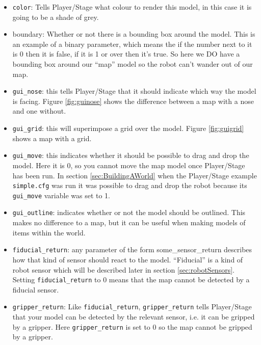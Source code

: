 \documentclass[a4paper]{report}
\newcommand{\plst}{Player/Stage\xspace}
\begin{document}
\begin{itemize}
\item \verb|color|: Tells \plst what colour to render this model, in this case it is going to be a shade of grey. 
\item boundary: Whether or not there is a bounding box around the model. This is an example of a binary parameter, which means the if the number next to it is 0 then it is false, if it is 1 or over then it's true. So here we DO have a bounding box around our ``map'' model so the robot can't wander out of our map.
\item \verb|gui_nose|: this tells \plst that it should indicate which way the model is facing. Figure \ref{fig:guinose} shows the difference between a map with a nose and one without.
\item \verb|gui_grid|: this will superimpose a grid over the model. Figure \ref{fig:guigrid} shows a map with a grid.
\item \verb|gui_move|: this indicates whether it should be possible to drag and drop the model. Here it is 0, so you cannot move the map model once \plst has been run. In section \ref{sec:BuildingAWorld} when the \plst example \verb|simple.cfg| was run it was possible to drag and drop the robot because its \verb|gui_move| variable was set to 1.
\item \verb|gui_outline|: indicates whether or not the model should be outlined. This makes no difference to a map, but it can be useful when making models of items within the world.


\item \verb|fiducial_return|: any parameter of the form some\_sensor\_return describes how that kind of sensor should react to the model. ``Fiducial'' is a kind of robot sensor which will be described later in section \ref{sec:robotSensors}. Setting \verb|fiducial_return| to 0 means that the map cannot be detected by a fiducial sensor.
\item \verb|gripper_return|: Like \verb|fiducial_return|, \verb|gripper_return| tells \plst that your model can be detected by the relevant sensor, i.e. it can be gripped by a gripper. Here \verb|gripper_return| is set to 0 so the map cannot be gripped by a gripper. 
\end{itemize}
\end{document}

